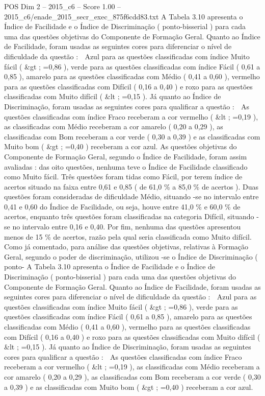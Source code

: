 \begin{textsample}{POS Dim 2 – 2015\_c6 – Score 1.00 – 2015\_c6/enade\_2015\_secr\_exec\_875f6cdd83.txt}
A Tabela 3.10 apresenta o Índice de Facilidade e o Índice de Discriminação ( ponto-bisserial ) para cada uma das questões objetivas do Componente de Formação Geral.
Quanto ao Índice de Facilidade, foram usadas as seguintes cores para diferenciar o nível de dificuldade da questão :  Azul para as questões classificadas com índice Muito fácil ( \&gt ; =0,86 ), verde para as questões classificadas com índice Fácil ( 0,61 a 0,85 ), amarelo para as questões classificadas com Médio ( 0,41 a 0,60 ), vermelho para as questões classificadas com Difícil ( 0,16 a 0,40 ) e roxo para as questões classificadas com Muito difícil ( \&lt ; =0,15 ).
Já quanto ao Índice de Discriminação, foram usadas as seguintes cores para qualificar a questão :  As questões classificadas com índice Fraco receberam a cor vermelho ( \&lt ; =0,19 ), as classificadas com Médio receberam a cor amarelo ( 0,20 a 0,29 ), as classificadas com Bom receberam a cor verde ( 0,30 a 0,39 ) e as classificadas com Muito bom ( \&gt ; =0,40 ) receberam a cor azul.
As questões objetivas do Componente de Formação Geral, segundo o Índice de Facilidade, foram assim avaliadas : das oito questões, nenhuma teve o Índice de Facilidade classificado como Muito fácil.
Três questões foram tidas como Fácil, por terem índice de acertos situado na faixa entre 0,61 e 0,85 ( de 61,0 \% a 85,0 \% de acertos ).
Duas questões foram consideradas de dificuldade Médio, situando -se no intervalo entre 0,41 e 0,60 do Índice de Facilidade, ou seja, houve entre 41,0 \% e 60,0 \% de acertos, enquanto três questões foram classificadas na categoria Difícil, situando -se no intervalo entre 0,16 e 0,40.
Por fim, nenhuma das questões apresentou menos de 15 \% de acertos, razão pela qual seria classificada como Muito difícil.
Como já comentado, para análise das questões objetivas, relativas à Formação Geral, segundo o poder de discriminação, utilizou -se o Índice de Discriminação ( ponto- A Tabela 3.10 apresenta o Índice de Facilidade e o Índice de Discriminação ( ponto-bisserial ) para cada uma das questões objetivas do Componente de Formação Geral.
Quanto ao Índice de Facilidade, foram usadas as seguintes cores para diferenciar o nível de dificuldade da questão :  Azul para as questões classificadas com índice Muito fácil ( \&gt ; =0,86 ), verde para as questões classificadas com índice Fácil ( 0,61 a 0,85 ), amarelo para as questões classificadas com Médio ( 0,41 a 0,60 ), vermelho para as questões classificadas com Difícil ( 0,16 a 0,40 ) e roxo para as questões classificadas com Muito difícil ( \&lt ; =0,15 ).
Já quanto ao Índice de Discriminação, foram usadas as seguintes cores para qualificar a questão :  As questões classificadas com índice Fraco receberam a cor vermelho ( \&lt ; =0,19 ), as classificadas com Médio receberam a cor amarelo ( 0,20 a 0,29 ), as classificadas com Bom receberam a cor verde ( 0,30 a 0,39 ) e as classificadas com Muito bom ( \&gt ; =0,40 ) receberam a cor azul.

\end{textsample}
